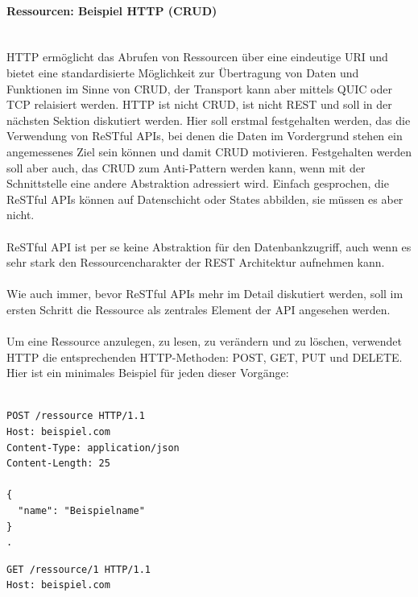 \documentclass[../vs-script-first-v01.tex]{subfiles}
\begin{document}
\paragraph{Ressourcen: Beispiel HTTP (CRUD)\\\\}
HTTP ermöglicht das Abrufen von Ressourcen über eine eindeutige URI und bietet eine standardisierte Möglichkeit zur Übertragung von Daten und Funktionen im Sinne von CRUD, der Transport kann aber mittels QUIC oder TCP relaisiert werden. HTTP ist nicht CRUD, ist nicht REST und soll in der nächsten Sektion diskutiert werden. Hier soll erstmal festgehalten werden, das die Verwendung von ReSTful APIs, bei denen die Daten im Vordergrund stehen ein angemessenes Ziel sein können und damit CRUD motivieren. Festgehalten werden soll aber auch, das CRUD zum Anti-Pattern werden kann, wenn mit der Schnittstelle eine andere Abstraktion adressiert wird. Einfach gesprochen, die ReSTful APIs können auf Datenschicht  oder States abbilden, sie müssen es aber nicht.\\\\ 
ReSTful API ist per se keine Abstraktion für den Datenbankzugriff, auch wenn es sehr stark den Ressourcencharakter der REST Architektur aufnehmen kann.\\\\
Wie auch immer, bevor ReSTful APIs mehr im Detail diskutiert werden, soll im ersten Schritt die Ressource als zentrales Element der API angesehen werden.\\\\
Um eine Ressource anzulegen, zu lesen, zu verändern und zu löschen, verwendet HTTP die entsprechenden HTTP-Methoden: POST, GET, PUT und DELETE. Hier ist ein minimales Beispiel für jeden dieser Vorgänge:\\\\

\noindent\begin{minipage}{\textwidth}
\begin{lstlisting}[caption={Ressource anlegen (POST)},captionpos=b,label={lst:post}]
POST /ressource HTTP/1.1
Host: beispiel.com
Content-Type: application/json
Content-Length: 25

{
  "name": "Beispielname"
}
.
\end{lstlisting}
\end{minipage}

\noindent\begin{minipage}{\textwidth}
\begin{lstlisting}[caption={Ressource lesen (GET)},captionpos=b,label={lst:get}]
GET /ressource/1 HTTP/1.1
Host: beispiel.com
\end{lstlisting}
\end{minipage}
\end{document}
